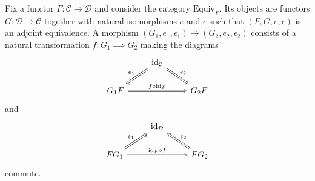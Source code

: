 Fix a functor $ F: \mathcal{C} \to \mathcal{D} $ and consider the category $ \text{Equiv}_F $. Its objects are functors $ G:\mathcal{D} \to \mathcal{C} $ together with natural isomorphisms $ e $ and $ \epsilon $ such that $ (F,G,e,\epsilon) $ is an adjoint equivalence. A morphism $ (G_1, e_1, \epsilon_1) \to (G_2, e_2, \epsilon_2) $ consists of a natural transformation $ f: G_1 \implies G_2 $ making the diagrams
\[\begin{tikzcd}
	& {\text{id}_\mathcal{C}} \\
	{G_1F} && {G_2F}
	\arrow["{e_1}"', Rightarrow, from=1-2, to=2-1]
	\arrow["{e_2}", Rightarrow, from=1-2, to=2-3]
	\arrow["{f\circ\text{id}_F}", Rightarrow, from=2-1, to=2-3]
\end{tikzcd}\]
and
\[\begin{tikzcd}
	& {\text{id}_\mathcal{D}} \\
	{FG_1} && {FG_2}
	\arrow["{\epsilon_1}", Rightarrow, from=2-1, to=1-2]
	\arrow["{\epsilon_2}"', Rightarrow, from=2-3, to=1-2]
	\arrow["{\text{id}_F\circ f}", Rightarrow, from=2-1, to=2-3]
\end{tikzcd}\]
commute.

